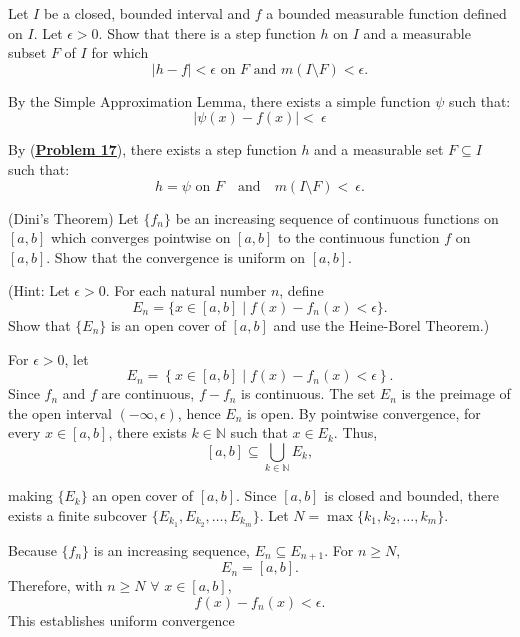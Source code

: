 \begin{exercise}{18}
    Let $I$ be a closed, bounded interval and $f$ a bounded measurable function defined on $I$. Let $\epsilon > 0$. Show that there is a step function $h$ on $I$ and a measurable subset $F$ of $I$ for which
    \begin{equation*}
        |h - f| < \epsilon \text{ on } F \text{ and } m(I \setminus F) < \epsilon.
    \end{equation*}
\end{exercise}

\begin{solution}

   By the Simple Approximation Lemma, there exists a simple function \( \psi \) such that:  
   \[
   |\psi(x) - f(x)| < \ \epsilon
   \] 

   By (\hyperref[ex:17]{\underline{\textbf{Problem 17}}}), there exists a step function \( h \) and a measurable set \( F \subseteq I \) such that:  
   \[
   h = \psi \text{ on } F \quad \text{and} \quad m(I \setminus F) < \ \epsilon.
   \]
\end{solution}

\begin{exercise}{22}
    (Dini’s Theorem) Let $\{f_n\}$ be an increasing sequence of continuous functions on $[a, b]$ which converges pointwise on $[a, b]$ to the continuous function $f$ on $[a, b]$. Show that the convergence is uniform on $[a, b]$. 

    (Hint: Let $\epsilon > 0$. For each natural number $n$, define
    \begin{equation*}
        E_n = \{ x \in [a, b] \mid f(x) - f_n(x) < \epsilon \}.
    \end{equation*}
    Show that $\{E_n\}$ is an open cover of $[a, b]$ and use the Heine-Borel Theorem.)
\end{exercise}

\begin{solution}
   For \( \epsilon > 0 \), let  
   \[
   E_n = \left\{ x \in [a, b] \mid f(x) - f_n(x) < \epsilon \right\}.
   \]
   Since \( f_n \) and \( f \) are continuous, \( f - f_n \) is continuous. The set \( E_n \) is the preimage of the open interval \( (-\infty, \epsilon) \), hence \( E_n \) is open.  
   By pointwise convergence, for every \( x \in [a, b] \), there exists \( k \in \mathbb{N} \) such that \( x \in E_k \). Thus,  
   \[
   [a, b] \subseteq \bigcup_{k \in \mathbb{N}} E_k,
   \]
   
   making \( \{E_k\} \) an open cover of \([a, b]\).  
   Since \([a, b]\) is closed and bounded, there exists a finite subcover \( \{E_{k_1}, E_{k_2}, \ldots, E_{k_m}\} \). Let \( N = \max\{k_1, k_2, \ldots, k_m\} \).  
   
   Because \( \{f_n\} \) is an increasing sequence, \( E_{n} \subseteq E_{n+1} \). For \( n \geq N \),  
   \[
   E_n = [a, b].
   \]  
   Therefore, with $n \geq N$ $\forall$ \( x \in [a, b] \),  
   \[
   f(x) - f_n(x) < \epsilon.
   \]  
   This establishes uniform convergence 
\end{solution}